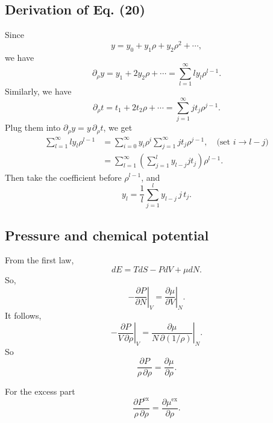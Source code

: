 \documentclass[preprint]{revtex4-1}
\numberwithin{equation}{subsection}
\numberwithin{table}{section}
\newcommand{\supex}[1]{ { { #1 }^{ \mathrm{ex} } } }
\newcommand{\Pex}{\supex{P}}
\newcommand{\muex}{\supex{\mu}}
\begin{document}
\subsection{Derivation of Eq. (20)}



Since
\begin{equation}
  y = y_0 + y_1 \rho + y_2 \rho^2 + \cdots,
  \tag{19}
\label{eq:yrseries}
\end{equation}
we have
\[
  \partial_\rho y = y_1  + 2 y_2 \rho + \cdots
  = \sum_{l = 1}^\infty l y_l \rho^{l-1}.
\]
Similarly, we have
\[
  \partial_\rho t = t_1  + 2 t_2 \rho + \cdots
  = \sum_{j = 1}^\infty j t_j \rho^{j-1}.
\]
Plug them into $\partial_\rho y = y \, \partial_\rho t$,
we get
\begin{align*}
  \sum_{l = 1}^\infty l y_l \rho^{l - 1}
&= \sum_{i = 0}^\infty y_i \rho^i
  \sum_{j = 1}^\infty j t_j \rho^{j - 1},
  \quad \mbox{(set $i \rightarrow l - j$)}
  \\
&=
  \sum_{l = 1}^\infty
  \left(
  \sum_{j = 1}^l y_{l - j} j t_j
  \right) \rho^{l - 1}.
\end{align*}
Then take the coefficient before $\rho^{l-1}$, and
\begin{equation}
  y_l = \frac{1}{l} \sum_{j = 1}^l y_{l - j} \, j \, t_j.
  \tag{20}
  \label{eq:ylexpseries}
\end{equation}



\subsection{Pressure and chemical potential}



From the first law,
\[
  dE = T dS - P dV + \mu dN.
\]
So,
\[
  -\left. \frac{ \partial P } {\partial N} \right|_{V}
  = \left. \frac{ \partial \mu } { \partial V } \right|_{N}.
\]
It follows,
\[
  -\left. \frac{ \partial P } {V \, \partial \rho} \right|_{V}
  = \left. \frac{ \partial \mu } {N \, \partial (1/\rho) } \right|_{N}.
\]
So
\begin{equation}
  \frac{ \partial P } {\rho \, \partial \rho}
  = \frac{ \partial \mu } { \partial \rho }.
  \label{eq:Pmu}
\end{equation}

For the excess part
\begin{equation}
  \frac{ \partial  \Pex } {\rho \, \partial \rho}
  = \frac{ \partial \muex } { \partial \rho }.
  \label{eq:Pmu}
\end{equation}
\end{document}
